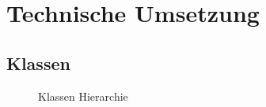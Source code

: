 \documentclass[12pt,a4paper,titlepage]{article}
\begin{document}
\section{Technische Umsetzung}
\subsection{Klassen}
\begin{figure}[ht]
  \centering
  \caption{Klassen Hierarchie}
  \label{class_digram}
\end{figure}
\end{document}
